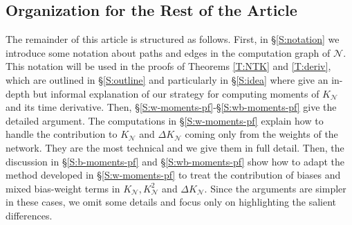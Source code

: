 \documentclass[11pt, reqno]{amsart}
\newcommand{\mN}{\mathcal N}
\begin{document}
\subsection{Organization for the Rest of the Article} The remainder of this article is structured as follows. First, in \S \ref{S:notation} we introduce some notation about paths and edges in the computation graph of $\mN$. This notation will be used in the proofs of Theorems \ref{T:NTK} and \ref{T:deriv}, which are outlined in \S \ref{S:outline} and particularly in \S \ref{S:idea} where give an in-depth but informal explanation of our strategy for computing moments of $K_{\mN}$ and its time derivative. Then, \S \ref{S:w-moments-pf}-\S\ref{S:wb-moments-pf} give the detailed argument. The computations in \S \ref{S:w-moments-pf} explain how to handle the contribution to $K_{\mN}$ and $\Delta K_{\mN}$ coming only from the weights of the network. They are the most technical and we give them in full detail. Then, the discussion in \S \ref{S:b-moments-pf} and \S \ref{S:wb-moments-pf} show how to adapt the method developed in \S \ref{S:w-moments-pf} to treat the contribution of biases and mixed bias-weight terms in $K_{\mN},K_{\mN}^2$ and $\Delta K_{\mN}$. Since the arguments are simpler in these cases, we omit some details and focus only on highlighting the salient differences. 
\end{document}
